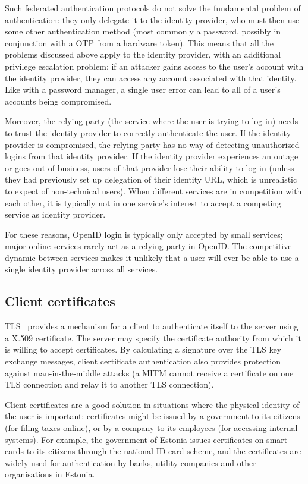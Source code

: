 Such federated authentication protocols do not solve the fundamental problem of authentication: they
only delegate it to the identity provider, who must then use some other authentication method (most
commonly a password, possibly in conjunction with a OTP from a hardware token). This means that all
the problems discussed above apply to the identity provider, with an additional privilege escalation
problem: if an attacker gains access to the user's account with the identity provider, they can
access any account associated with that identity. Like with a password manager, a single user error
can lead to all of a user's accounts being compromised.

Moreover, the relying party (the service where the user is trying to log in) needs to trust the
identity provider to correctly authenticate the user.  If the identity provider is compromised, the
relying party has no way of detecting unauthorized logins from that identity provider. If the
identity provider experiences an outage or goes out of business, users of that provider lose their
ability to log in (unless they had previously set up delegation of their identity URL, which is
unrealistic to expect of non-technical users). When different services are in competition with each
other, it is typically not in one service's interest to accept a competing service as identity
provider.

For these reasons, OpenID login is typically only accepted by small services; major online services
rarely act as a relying party in OpenID. The competitive dynamic between services makes it unlikely
that a user will ever be able to use a single identity provider across all services.

\subsection{Client certificates}\label{sec:clientcerts}

TLS~\cite{TLS} provides a mechanism for a client to authenticate itself to the server using a X.509
certificate. The server may specify the certificate authority from which it is willing to accept
certificates. By calculating a signature over the TLS key exchange messages, client certificate
authentication also provides protection against man-in-the-middle attacks (a MITM cannot receive a
certificate on one TLS connection and relay it to another TLS connection).

Client certificates are a good solution in situations where the physical identity of the user is
important: certificates might be issued by a government to its citizens (for filing taxes online),
or by a company to its employees (for accessing internal systems). For example, the government of
Estonia issues certificates on smart cards to its citizens through the national ID card scheme, and
the certificates are widely used for authentication by banks, utility companies and other
organisations in Estonia.~\cite{Parsovs14}

